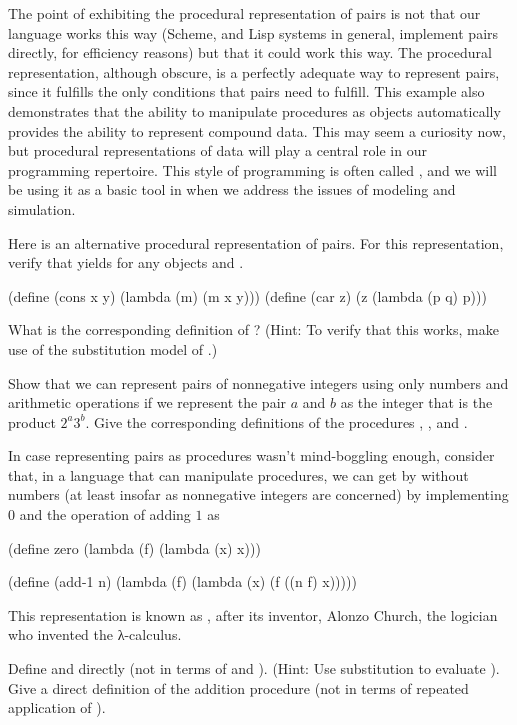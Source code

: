 The point of exhibiting the procedural representation of pairs is not that our language works this way (Scheme, and Lisp systems in general, implement pairs directly, for efficiency reasons) but that it could work this way.
The procedural representation, although obscure, is a perfectly adequate way to represent pairs, since it fulfills the only conditions that pairs need to fulfill.
This example also demonstrates that the ability to manipulate procedures as objects automatically provides the ability to represent compound data.
This may seem a curiosity now, but procedural representations of data will play a central role in our programming repertoire.
This style of programming is often called , and we will be using it as a basic tool in  when we address the issues of modeling and simulation.



\begin{exercise}
	\label{Exercise 2.4}
	Here is an alternative procedural representation of pairs.
	For this representation, verify that  yields  for any objects  and .
	\begin{scheme}
	  (define (cons x y)
	    (lambda (m) (m x y)))
	  (define (car z)
	    (z (lambda (p q) p)))
	\end{scheme}
	What is the corresponding definition of ?
	(Hint:
	To verify that this works, make use of the substitution model of .)
\end{exercise}



\begin{exercise}
	\label{Exercise 2.5}
	Show that we can represent pairs of nonnegative integers using only numbers and arithmetic operations if we represent the pair \( a \) and \( b \) as the integer that is the product \( 2^a 3^b \).
	Give the corresponding definitions of the procedures , , and .
\end{exercise}



\begin{exercise}
	\label{Exercise 2.6}
	In case representing pairs as procedures wasn’t mind-boggling enough, consider that, in a language that can manipulate procedures, we can get by without numbers (at least insofar as nonnegative integers are concerned) by implementing 0 and the operation of adding \( 1 \) as
	\begin{scheme}
	  (define zero (lambda (f) (lambda (x) x)))

	  (define (add-1 n)
	    (lambda (f) (lambda (x) (f ((n f) x)))))
	\end{scheme}
	This representation is known as , after its inventor, Alonzo Church, the logician who invented the λ-calculus.

	Define  and  directly (not in terms of  and ).
	(Hint:
	Use substitution to evaluate ).
	Give a direct definition of the addition procedure \code{+} (not in terms of repeated application of ).
\end{exercise}
